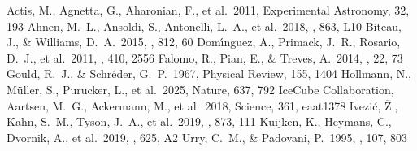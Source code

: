 \documentclass[twocolumn,linenumbers,floatfix]{aastex701}
\begin{document}
\begin{thebibliography}{}
 Actis, M., Agnetta, G., Aharonian, F., et al.\ 2011, Experimental Astronomy, 32, 193
 Ahnen, M.~L., Ansoldi, S., Antonelli, L.~A., et al.\ 2018, \apjl, 863, L10
 Biteau, J., \& Williams, D.~A.\ 2015, \apj, 812, 60
 Dom{\'\i}nguez, A., Primack, J.~R., Rosario, D.~J., et al.\ 2011, \mnras, 410, 2556
 Falomo, R., Pian, E., \& Treves, A.\ 2014, \aapr, 22, 73
 Gould, R.~J., \& Schr{\'e}der, G.~P.\ 1967, Physical Review, 155, 1404
 Hollmann, N., M{\"u}ller, S., Purucker, L., et al.\ 2025, Nature, 637, 792
 IceCube Collaboration, Aartsen, M.~G., Ackermann, M., et al.\ 2018, Science, 361, eaat1378
 Ivezi{\'c}, {\v{Z}}., Kahn, S.~M., Tyson, J.~A., et al.\ 2019, \apj, 873, 111
 Kuijken, K., Heymans, C., Dvornik, A., et al.\ 2019, \aap, 625, A2
 Urry, C.~M., \& Padovani, P.\ 1995, \pasp, 107, 803
\end{thebibliography}
\end{document}
